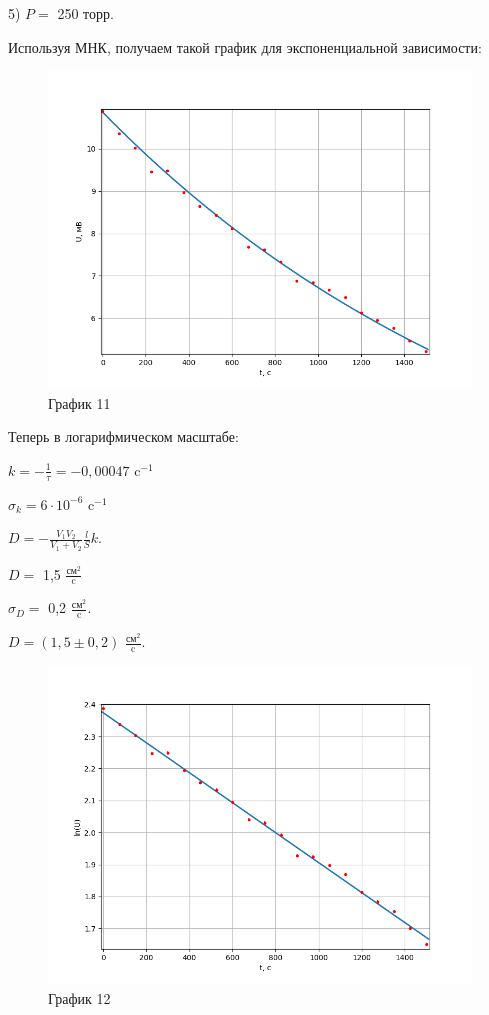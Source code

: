 \documentclass[a4paper,12pt]{article} %
\begin{document}
\begin{enumerate}
\newpage


5) $P = $ 250 торр.

Используя МНК, получаем такой график для экспоненциальной зависимости:
\begin{figure}[h!]
	\centering
	\includegraphics[scale=0.8]{График5(эксп).png}
	\caption*{График 11}
\end{figure}

Теперь в логарифмическом масштабе:

$k = -\frac{1}{\tau} = -0,00047$ c$^{-1}$

$\sigma_{k} = 6\cdot 10^{-6}$ c$^{-1}$

$D = - \frac{V_{1}V_{2}}{V_{1} + V_{2}}\frac{l}{S}k$.

$D = $ 1,5 $\frac{\text{см}^2}{\text{c}}$

$\sigma_{D} = $ 0,2 $\frac{\text{см}^2}{\text{c}}$.
\vspace{15mm}

$D = (1,5 \pm 0,2)$ $\frac{\text{см}^2}{\text{c}}$.
\newpage
\begin{figure}[h!]
	\centering
	\includegraphics[scale=0.8]{График5(лин).png}
	\caption*{График 12}
\end{figure}


\end{enumerate}
\end{document}
